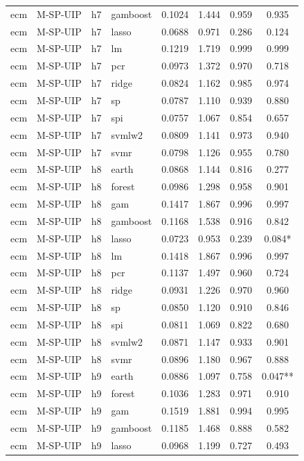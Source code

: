 \begin{ThreePartTable}
\begin{longtable}[t]{llclcccc}
ecm & M-SP-UIP & h7 & gamboost & 0.1024 & 1.444 & 0.959 & 0.935\\
ecm & M-SP-UIP & h7 & lasso & 0.0688 & 0.971 & 0.286 & 0.124\\
ecm & M-SP-UIP & h7 & lm & 0.1219 & 1.719 & 0.999 & 0.999\\
ecm & M-SP-UIP & h7 & pcr & 0.0973 & 1.372 & 0.970 & 0.718\\
ecm & M-SP-UIP & h7 & ridge & 0.0824 & 1.162 & 0.985 & 0.974\\
ecm & M-SP-UIP & h7 & sp & 0.0787 & 1.110 & 0.939 & 0.880\\
ecm & M-SP-UIP & h7 & spi & 0.0757 & 1.067 & 0.854 & 0.657\\
ecm & M-SP-UIP & h7 & svmlw2 & 0.0809 & 1.141 & 0.973 & 0.940\\
ecm & M-SP-UIP & h7 & svmr & 0.0798 & 1.126 & 0.955 & 0.780\\
\addlinespace
ecm & M-SP-UIP & h8 & earth & 0.0868 & 1.144 & 0.816 & 0.277\\
ecm & M-SP-UIP & h8 & forest & 0.0986 & 1.298 & 0.958 & 0.901\\
ecm & M-SP-UIP & h8 & gam & 0.1417 & 1.867 & 0.996 & 0.997\\
ecm & M-SP-UIP & h8 & gamboost & 0.1168 & 1.538 & 0.916 & 0.842\\
ecm & M-SP-UIP & h8 & lasso & 0.0723 & 0.953 & 0.239 & 0.084*\\
ecm & M-SP-UIP & h8 & lm & 0.1418 & 1.867 & 0.996 & 0.997\\
ecm & M-SP-UIP & h8 & pcr & 0.1137 & 1.497 & 0.960 & 0.724\\
ecm & M-SP-UIP & h8 & ridge & 0.0931 & 1.226 & 0.970 & 0.960\\
ecm & M-SP-UIP & h8 & sp & 0.0850 & 1.120 & 0.910 & 0.846\\
ecm & M-SP-UIP & h8 & spi & 0.0811 & 1.069 & 0.822 & 0.680\\
ecm & M-SP-UIP & h8 & svmlw2 & 0.0871 & 1.147 & 0.933 & 0.901\\
ecm & M-SP-UIP & h8 & svmr & 0.0896 & 1.180 & 0.967 & 0.888\\
\addlinespace
ecm & M-SP-UIP & h9 & earth & 0.0886 & 1.097 & 0.758 & 0.047**\\
ecm & M-SP-UIP & h9 & forest & 0.1036 & 1.283 & 0.971 & 0.910\\
ecm & M-SP-UIP & h9 & gam & 0.1519 & 1.881 & 0.994 & 0.995\\
ecm & M-SP-UIP & h9 & gamboost & 0.1185 & 1.468 & 0.888 & 0.582\\
ecm & M-SP-UIP & h9 & lasso & 0.0968 & 1.199 & 0.727 & 0.493\\

\end{longtable}
\end{ThreePartTable}
